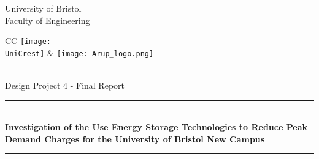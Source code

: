 \documentclass[fontsize=9.5pt]{extarticle}
\numberwithin{figure}{section} %
\newcommand{\AssignmentTitle}{Investigation of the Use Energy Storage Technologies to Reduce Peak Demand Charges for the University of Bristol New Campus}
\newcommand{\ModuleTitle}{Design Project 4 - Final Report}
\newcommand{\University}{University of Bristol}
\newcommand{\Faculty}{Faculty of Engineering}
\newcommand{\UniCrest}{crestbris.png}
\newcommand{\horrule}[1]{\rule{\linewidth}{#1}}
\begin{document}
  \setlength{\abovedisplayskip}{-18pt}
  \setlength{\belowdisplayskip}{0pt}
  \setlength{\abovedisplayshortskip}{-18pt}
  \setlength{\belowdisplayshortskip}{0pt}



\begin{titlepage}

	\center %
		\normalfont \normalsize \University \\ [10pt]
		\normalfont \normalsize \Faculty \\ [25pt]
\begin{tabular}{CC}
  \texttt{[image: \\UniCrest]} &   \texttt{[image: Arup\_logo.png]}
\end{tabular}\\[0.5cm]
		\normalfont \normalsize \ModuleTitle \\ [25pt]
		\horrule{0.5pt} \\[0.4cm]
		\huge \textbf{\AssignmentTitle} \\
		\horrule{2pt} \\[0.5cm]

\end{titlepage}
\end{document}
